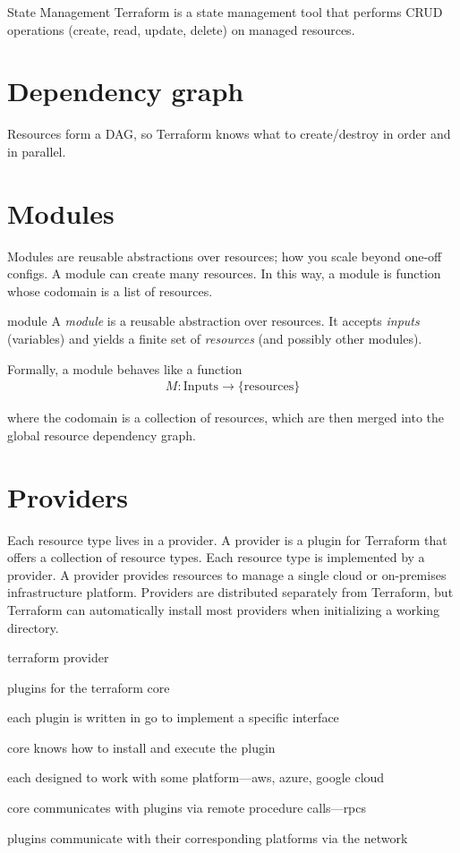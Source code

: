 \documentclass[openany, 12pt]{book}
\begin{document}
\begin{definition}{State Management}{}
	Terraform is a state management tool that performs CRUD operations (create,
	read, update, delete) on managed resources.
\end{definition}

\chapter{Dependency graph}
Resources form a DAG, so Terraform knows what to create/destroy in order and in
parallel.

\chapter{Modules}
Modules are reusable abstractions over resources; how you scale beyond one-off configs.
A module can create many resources. In this way, a module is function whose
codomain is a list of resources.

\begin{definition}{module}{}
	A \emph{module} is a reusable abstraction over resources. It accepts
	\emph{inputs} (variables) and yields a finite set of \emph{resources}
	(and possibly other modules).

	Formally, a module behaves like a function
	\begin{align*}
		M : \text{Inputs} \to \{\text{resources}\}
	\end{align*}

	where the codomain is a collection of resources, which are then merged
	into the global resource dependency graph.
\end{definition}


\chapter{Providers}
Each resource type lives in a provider. A provider is a plugin for Terraform
that offers a collection of resource types. Each resource type is implemented by
a provider. A provider provides resources to manage a single cloud or
on-premises infrastructure platform. Providers are distributed separately from
Terraform, but Terraform can automatically install most providers when
initializing a working directory.

\begin{definition}{terraform provider}{}
	\begin{alist}
		\item plugins for the terraform core
		\item each plugin is written in go to implement a specific interface
		\item core knows how to install and execute the plugin
		\item each designed to work with some platform---aws, azure, google cloud
		\item core communicates with plugins via remote procedure calls---rpcs
		\item plugins communicate with their corresponding platforms via the network
	\end{alist}

\end{definition}
\end{document}
